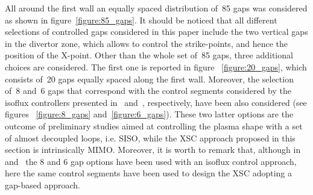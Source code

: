  All around the first wall an equally spaced distribution of~85 gaps was considered as shown in figure~\ref{figure:85_gaps}. It should be noticed that all different selections of controlled gaps considered in this paper include the two vertical gaps in the divertor zone, which allows to control the strike-points, and hence the position of the X-point. Other than the whole set of~85 gaps,  three additional choices are considered. The first one is reported in figure ~\ref{figure:20_gaps}, which consists of~20 gaps equally spaced along the first wall. Moreover, the selection of~8 and~6 gaps that correspond with the control segments considered by the isoflux controllers presented in~\cite{miyata2013study} and~\cite{Miyata:2014}, respectively, have been also considered (see  figures ~\ref{figure:8_gaps} and~\ref{figure:6_gaps}). These two latter options are the outcome of preliminary studies aimed at controlling the plasma shape with a set of almost decoupled loops, i.e.  SISO, while the XSC approach proposed in this section is intrinsically MIMO. Moreover, it is worth to remark that, although in~\cite{miyata2013study} and~\cite{Miyata:2014} the 8 and 6 gap options have been used with an isoflux control approach, here the same control segments have been used to design the XSC adopting a gap-based approach.\smallskip


